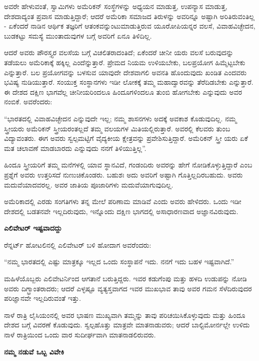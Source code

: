 ಅವರೇ ಹೇಳುವಂತೆ, ಸ್ವಾಮಿಗಳು ಅಮೆರಿಕನ್ ಸಂಸ್ಥೆಗಳನ್ನು ಅಧ್ಯಯನ ಮಾಡುತ್ತ, ಉಪನ್ಯಾಸ ಮಾಡುತ್ತ, ದೇಶದಾದ್ಯಂತ ಪ್ರವಾಸ ಮಾಡುತ್ತಿದ್ದಾರೆ; ಆದರೆ ಅಮೆರಿಕಾ ಸಮಾಜದ ತಿರುಳನ್ನು ಅವರಿನ್ನೂ ಅಷ್ಟಾಗಿ ಅರಿತಿರುವಂತಿಲ್ಲ - ಏಕೆಂದರೆ ನಾಡಿನ ಆರ್ಥಿಕ ತಜ್ಞರಿಗೆ ಆತಂಕವನ್ನುಂಟುಮಾಡುತ್ತಿರುವ ಯೂರೋಪಿಯನ್ನರ ವಲಸೆ, ವಿವಾಹವಿಚ್ಛೇದನ, ಬುಡಕಟ್ಟು ಸಮಸ್ಯೆ ಮುಂತಾದುವುಗಳ ಬಗ್ಗೆ ಅವರಿಗೆ ಏನೂ ತಿಳಿದಿಲ್ಲ.

ಆದರೆ ಅವರು ಪೌರಸ್ತ್ಯರ ವಲಸೆಯ ಬಗ್ಗೆ ವಿಚಲಿತರಾದಂತಿದೆ; ಏಕೆಂದರೆ ಚೀನೀ ಯರು ವಲಸೆ ಬರುವುದನ್ನು ತಡೆಯಲು ಅಮೆರಿಕಾಕ್ಕೆ ಹಕ್ಕಿಲ್ಲ ಎಂದೆನ್ನುತ್ತಾರೆ. ಪ್ರೇಮದ ನಿಯಮ ಉಳಿಯಬೇಕು, ಬಲಪ್ರಯೋಗ ಹಿಮ್ಮೆಟ್ಟಬೇಕು ಎನ್ನುತ್ತಾರೆ. ಬಲ ಪ್ರಯೋಗವನ್ನು ಬಳಸುವ ಯಾವುದೇ ದೇಶವಾಗಲಿ ಅವನತಿ ಹೊಂದುವುದು ಖಂಡಿತ ಎಂದವರು ಭವಿಷ್ಯ ನುಡಿಯುತ್ತಾರೆ. ಸಂಯುಕ್ತ ಸಂಸ್ಥಾನಗಳು ಇಡೀ ಲೋಕಕ್ಕೆ ತಮ್ಮ ಮಹಾದ್ವಾರವನ್ನು ತೆರೆದಿಡಬೇಕು ಎನ್ನುತ್ತಾರೆ. ಈ ದೇಶದ ದಕ್ಷಿಣ ಭಾಗವೆಲ್ಲ ಚೀನೀಯರಿಂದಲೂ ಹಿಂದೂಗಳಿಂದಲೂ ತುಂಬಿ ಹೋಗಬೇಕು ಎನ್ನುವುದು ಅವರ ನಂಬಿಕೆ. ಅವರೆಂದರು:

“ಭಾರತದಲ್ಲಿ ವಿವಾಹವಿಚ್ಛೇದನ ಎನ್ನುವುದೇ ಇಲ್ಲ; ನಮ್ಮ ಶಾಸನಗಳು ಅದಕ್ಕೆ ಅವಕಾಶ ಕೊಡುವುದಿಲ್ಲ. ನಮ್ಮ ಸ್ತ್ರೀಯರು ಅಮೆರಿಕನ್ ಸ್ತ್ರೀಯರಂತಲ್ಲದೆ ತಮ್ಮ ವಲಯಗಳ ಮಿತಿಯಲ್ಲಿರುತ್ತಾರೆ. ಅವರಲ್ಲಿ ಕೆಲವರು ತುಂಬ ವಿದ್ಯಾವಂತರು. ಈಗ ಅವರು ಸ್ವಲ್ಪಮಟ್ಟಿಗೆ ವೈದ್ಯಕೀಯ ಕ್ಷೇತ್ರವನ್ನು ಪ್ರವೇಶಿಸುತ್ತಿದ್ದಾರೆ. ಅಮೆರಿಕನ್ ಸ್ತ್ರೀ ಯರು ಏಕೆ ಮತ ಚಲಾವಣೆ ಮಾಡಬಾರದು ಎನ್ನುವುದು ನನಗೆ ತಿಳಿಯುತ್ತಿಲ್ಲ”.

ಹಿಂದೂ ಸ್ತ್ರೀಯರಿಗೆ ತಮ್ಮ ಮನೆಗಳಲ್ಲಿ ಯಾವ ಸ್ಥಾನವಿದೆ, ಗಂಡಂದಿರು ಅವರನ್ನು ಹೇಗೆ ನೋಡಿಕೊಳ್ಳುತ್ತಿದ್ದಾರೆ ಎಂಬ ಪ್ರಶ್ನೆಗೆ ಅವರು ಉತ್ತರಿಸದೆ ನುಣುಚಿಕೊಂಡರು. ಬಹುಶಃ ಅದು ಅವರಿಗೆ ಅಷ್ಟಾಗಿ ಗೊತ್ತಿಲ್ಲದಿರಬಹುದು. ಅವರು ಮದುವೆಯಾದವರಲ್ಲ. ಅವರ ಜಾತಿಯ ಪೂಜಾರಿಗಳು ಮದುವೆಯಾಗುವುದಿಲ್ಲ.

ಅಮೆರಿಕಾದಲ್ಲಿ ಎರಡು ಸಂಗತಿಗಳು ತನ್ನ ಮೇಲೆ ಪರಿಣಾಮ ಮಾಡಿವೆ ಎಂದು ಅವರು ಹೇಳಿದರು. ಒಂದು ಇಡೀ ದೇಶದಲ್ಲಿ ಬಡತನವೇ ಇಲ್ಲದಿರುವುದು, ಇನ್ನೊಂದು ದಕ್ಷಿಣ ಭಾಗದಲ್ಲಿ ಅಸಾಧಾರಣವಾದ ಅಜ್ಞಾನವಿರುವುದು.

\begin{center}
\textbf{ಎಲಿವೇಟರ್ ಇಷ್ಟವಾದದ್ದು}
\end{center}

ರೆನ್ನರ್ಟ್ ಹೋಟಲಿನಲ್ಲಿ ಎಲಿವೇಟರ್ ಬಳಿ ಹೋದಾಗ ಅವರೆಂದರು:

“ನಮ್ಮ ಭಾರತದಲ್ಲಿ ಎಷ್ಟು ಮಾತ್ರಕ್ಕೂ ಇಲ್ಲದ ಒಂದು ಸಂಸ್ಥಾಪನೆ ಇದು. ನನಗೆ ಇದು ಬಹಳ ಇಷ್ಟವಾಗಿದೆ.”

ಮಹಿಳೆಯೊಬ್ಬರು ಎಲಿವೇಟರ್ನಿಂದ ಆಗತಾನೆ ಬರುತ್ತಿದ್ದರು. ಇವರ ಕಡುಗೆಂಪು ಮತ್ತು ಹಳದಿ ಉಡುಪನ್ನು ನೋಡಿ ಅವರು ದಿಗ್ಭ್ರಾಂತರಾದರು; ಆದರೆ ಎಳ್ಳಷ್ಟೂ ವ್ಯತ್ಯಸ್ತವಾಗದ ಇವರ ಮುಖಭಾವ ತಾವು ಅವರ ಗಮನ ಸೆಳೆದಿರುವುದರ ಪರಿಜ್ಞಾನವೇ ಇಲ್ಲದಿರುವಂತೆ ಇತ್ತು.

ನಾಳೆ ರಾತ್ರಿ ಲೈಸಿಯಂನಲ್ಲಿ ಅವರ ಭಾಷಣ ಮುಖ್ಯವಾಗಿ ತಮ್ಮನ್ನು ತಾವು ಪರಿಚಯಿಸಿಕೊಳ್ಳುವುದು ಮತ್ತು ಹಿಂದೂ ದೇಶದ ಬಗ್ಗೆ ವಿವರಣೆ ಕೊಡುವುದು. ಸ್ವಲ್ಪಹೊತ್ತು ಮಾತ್ರವೇ ಮಾತನಾಡುವರು; ಆದರೆ ಬಾಲ್ಟಿಮೋರ್ನಲ್ಲೇ ಉಳಿದು ನಾಳೆ ರಾತ್ರಿಯಿಂದ ಒಂದು ವಾರ ಸುದೀರ್ಘವಾಗಿ ಮಾತನಾಡಲಿರುವರು.

\begin{center}
\textbf{ನಮ್ಮ ನಡುವೆ ಒಬ್ಬ ವಿವೇಕಿ}
\end{center}

